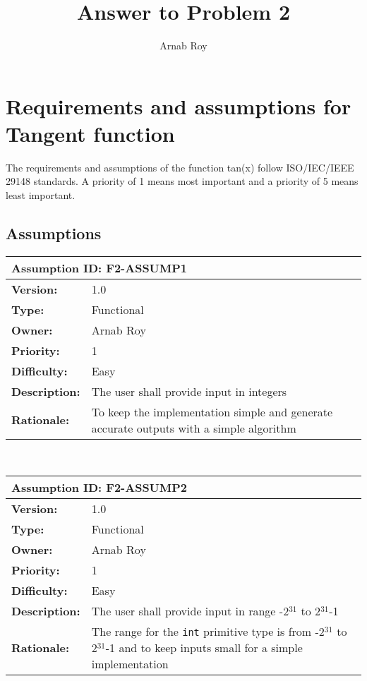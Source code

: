 \documentclass[12pt]{article}
\title{Answer to Problem 2}
\author{Arnab Roy}
\begin{document}
\maketitle

\section{Requirements and assumptions for Tangent function}
The requirements and assumptions of the function tan(x) follow ISO/IEC/IEEE 29148 standards. A priority of 1 means most important and a priority of 5 means least important.
\subsection{Assumptions}
\begin{tabular}{ |p{4cm} | p{10cm}| }
 \hline
 \multicolumn{2}{|l|}{\textbf{Assumption ID: F2-ASSUMP1}} \\
 \hline
 \textbf{Version:} & 1.0\\
 \textbf{Type:} & Functional\\
 \textbf{Owner:} & Arnab Roy\\
 \textbf{Priority:} & 1\\
 \textbf{Difficulty:} & Easy\\
 \textbf{Description:} & The user shall provide input in integers \\
 \textbf{Rationale:} & To keep the implementation simple and generate accurate outputs with a simple algorithm \\
 \hline
\end{tabular}
\\[10pt]
\begin{tabular}{ |p{4cm} | p{10cm}| }
 \hline
 \multicolumn{2}{|l|}{\textbf{Assumption ID: F2-ASSUMP2}} \\
 \hline
 \textbf{Version:} & 1.0\\
 \textbf{Type:} & Functional\\
 \textbf{Owner:} & Arnab Roy\\
 \textbf{Priority:} & 1\\
 \textbf{Difficulty:} & Easy\\
 \textbf{Description:} & The user shall provide input in range -2$^{31}$ to 2$^{31}$-1 \\
 \textbf{Rationale:} & The range for the \texttt{int} primitive type is from -2$^{31}$ to 2$^{31}$-1 and to keep inputs small for a simple implementation\\
 \hline
\end{tabular}
\end{document}
